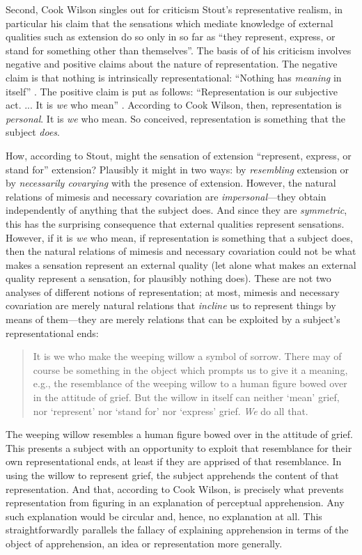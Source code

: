 \documentclass[11pt]{article}
\begin{document}
Second, Cook Wilson singles out for criticism Stout’s \citeyearpar[144]{Stout:1903zl} representative realism, in particular his claim that the sensations which mediate knowledge of external qualities such as extension do so only in so far as ``they represent, express, or stand for something other than themselves''. The basis of of his criticism involves negative and positive claims about the nature of representation. The negative claim is that nothing is intrinsically representational: ``Nothing has \emph{meaning} in itself'' \citep[770]{Cook-Wilson:1926sf}. The positive claim is put as follows: ``Representation is our subjective act. ... It is \emph{we} who mean'' \citep[770]{Cook-Wilson:1926sf}. According to Cook Wilson, then, representation is \emph{personal}. It is \emph{we} who mean. So conceived, representation is something that the subject \emph{does}. 

How, according to Stout, might the sensation of extension ``represent, express, or stand for'' extension? Plausibly it might in two ways: by \emph{resembling} extension or by \emph{necessarily covarying} with the presence of extension. However, the natural relations of mimesis and necessary covariation are \emph{impersonal}---they obtain independently of anything that the subject does. And since they are \emph{symmetric}, this has the surprising consequence that external qualities represent sensations. However, if it is \emph{we} who mean, if representation is something that a subject does, then the natural relations of mimesis and necessary covariation could not be what makes a sensation represent an external quality (let alone what makes an external quality represent a sensation, for plausibly nothing does). These are not two analyses of different notions of representation; at most, mimesis and necessary covariation are merely natural relations that \emph{incline} us to represent things by means of them---they are merely relations that can be exploited by a subject's representational ends:
\begin{quote}
	It is we who make the weeping willow a symbol of sorrow. There may of course be something in the object which prompts us to give it a meaning, e.g., the resemblance of the weeping willow to a human figure bowed over in the attitude of grief. But the willow in itself can neither `mean' grief, nor `represent' nor `stand for' nor `express' grief. \emph{We} do all that.  \citep[770]{Cook-Wilson:1926sf}
\end{quote}
The weeping willow resembles a human figure bowed over in the attitude of grief. This presents a subject with an opportunity to exploit that resemblance for their own representational ends, at least if they are apprised of that resemblance. In using the willow to represent grief, the subject apprehends the content of that representation. And that, according to Cook Wilson, is precisely what prevents representation from figuring in an explanation of perceptual apprehension. Any such explanation would be circular and, hence, no explanation at all. This straightforwardly parallels the fallacy of explaining apprehension in terms of the object of apprehension, an idea or representation more generally.
\end{document}
